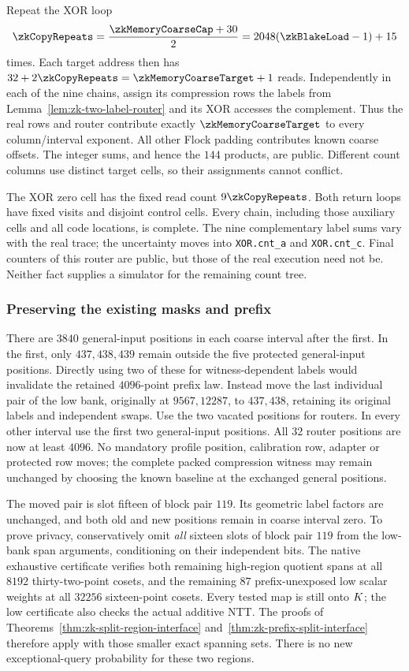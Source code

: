 Repeat the XOR loop
\[
 \zkCopyRepeats=\frac{\zkMemoryCoarseCap+30}{2}
 =2048(\zkBlakeLoad-1)+15
\]
times. Each target address then has $32+2\zkCopyRepeats=\zkMemoryCoarseTarget+1$ reads. Independently in each of the nine chains, assign its compression rows the labels from Lemma~\ref{lem:zk-two-label-router} and its XOR accesses the complement. Thus the real rows and router contribute exactly $\zkMemoryCoarseTarget$ to every column/interval exponent. All other Flock padding contributes known coarse offsets. The integer sums, and hence the $144$ products, are public. Different count columns use distinct target cells, so their assignments cannot conflict.

The XOR zero cell has the fixed read count $9\zkCopyRepeats$. Both return loops have fixed visits and disjoint control cells. Every chain, including those auxiliary cells and all code locations, is complete. The nine complementary label sums vary with the real trace; the uncertainty moves into \texttt{XOR.cnt\_a} and \texttt{XOR.cnt\_c}. Final counters of this router are public, but those of the real execution need not be. Neither fact supplies a simulator for the remaining count tree.

\subsubsection{Preserving the existing masks and prefix}

There are $3840$ general-input positions in each coarse interval after the first. In the first, only $437,438,439$ remain outside the five protected general-input positions. Directly using two of these for witness-dependent labels would invalidate the retained $4096$-point prefix law. Instead move the last individual pair of the low bank, originally at $9567,12287$, to $437,438$, retaining its original labels and independent swaps. Use the two vacated positions for routers. In every other interval use the first two general-input positions. All $32$ router positions are now at least $4096$. No mandatory profile position, calibration row, adapter or protected row moves; the complete packed compression witness may remain unchanged by choosing the known baseline at the exchanged general positions.

The moved pair is slot fifteen of block pair $119$. Its geometric label factors are unchanged, and both old and new positions remain in coarse interval zero. To prove privacy, conservatively omit \emph{all} sixteen slots of block pair $119$ from the low-bank span arguments, conditioning on their independent bits. The native exhaustive certificate verifies both remaining high-region quotient spans at all $8192$ thirty-two-point cosets, and the remaining $87$ prefix-unexposed low scalar weights at all $32256$ sixteen-point cosets. Every tested map is still onto $K$; the low certificate also checks the actual additive NTT. The proofs of Theorems~\ref{thm:zk-split-region-interface} and~\ref{thm:zk-prefix-split-interface} therefore apply with those smaller exact spanning sets. There is no new exceptional-query probability for these two regions.

